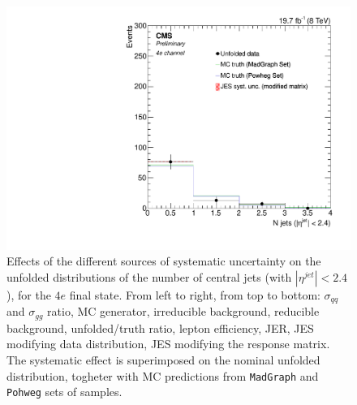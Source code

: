 \begin{figure}[hbtp]
\begin{center}
    \includegraphics[width=0.8\cmsFigWidth]{Figures/Unfolding/Systematics/ZZTo4e_CentralJets_JES_ModMat_Mad_fr}
    \caption{Effects of the different sources of systematic uncertainty on the unfolded distributions of the number of central jets (with $|\eta^{jet}|<2.4$), for the     
    $4e$ final state. From left to right, from top to bottom: $\sigma_{qq}$ and $\sigma_{gg}$ ratio, MC generator, irreducible background,
reducible background, unfolded/truth ratio, lepton efficiency, JER, JES modifying data distribution, JES modifying the response matrix. The systematic effect is superimposed on the nominal unfolded distribution, togheter with MC predictions from \texttt{MadGraph} and \texttt{Pohweg} sets of samples.}
    \label{fig:CentralJets_syst_4e}
  \end{center}
\end{figure}
\clearpage
